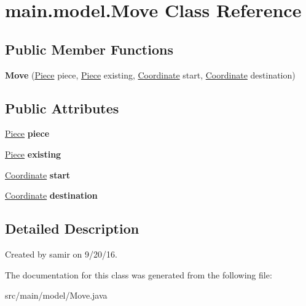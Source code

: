 \hypertarget{classmain_1_1model_1_1_move}{}\section{main.\+model.\+Move Class Reference}
\label{classmain_1_1model_1_1_move}
\subsection*{Public Member Functions}
\begin{DoxyCompactItemize}
\item 
\hypertarget{classmain_1_1model_1_1_move_ae58ed72f93d320e6ac77a3d41763cf3a}{}\label{classmain_1_1model_1_1_move_ae58ed72f93d320e6ac77a3d41763cf3a} 
{\bfseries Move} (\hyperlink{classmain_1_1pieces_1_1_piece}{Piece} piece, \hyperlink{classmain_1_1pieces_1_1_piece}{Piece} existing, \hyperlink{classmain_1_1model_1_1_coordinate}{Coordinate} start, \hyperlink{classmain_1_1model_1_1_coordinate}{Coordinate} destination)
\end{DoxyCompactItemize}
\subsection*{Public Attributes}
\begin{DoxyCompactItemize}
\item 
\hypertarget{classmain_1_1model_1_1_move_ae178b74847fe536dad796f48390ae54c}{}\label{classmain_1_1model_1_1_move_ae178b74847fe536dad796f48390ae54c} 
\hyperlink{classmain_1_1pieces_1_1_piece}{Piece} {\bfseries piece}
\item 
\hypertarget{classmain_1_1model_1_1_move_ae760e3c16a4fbf92238c3ca1486d4210}{}\label{classmain_1_1model_1_1_move_ae760e3c16a4fbf92238c3ca1486d4210} 
\hyperlink{classmain_1_1pieces_1_1_piece}{Piece} {\bfseries existing}
\item 
\hypertarget{classmain_1_1model_1_1_move_a3973ab000bb39455751cbb37b9637096}{}\label{classmain_1_1model_1_1_move_a3973ab000bb39455751cbb37b9637096} 
\hyperlink{classmain_1_1model_1_1_coordinate}{Coordinate} {\bfseries start}
\item 
\hypertarget{classmain_1_1model_1_1_move_a84feb2deeddd1256796fbae5cc31ef95}{}\label{classmain_1_1model_1_1_move_a84feb2deeddd1256796fbae5cc31ef95} 
\hyperlink{classmain_1_1model_1_1_coordinate}{Coordinate} {\bfseries destination}
\end{DoxyCompactItemize}


\subsection{Detailed Description}
Created by samir on 9/20/16. 

The documentation for this class was generated from the following file\+:\begin{DoxyCompactItemize}
\item 
src/main/model/Move.\+java\end{DoxyCompactItemize}
